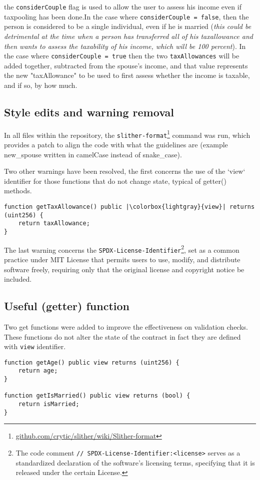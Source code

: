 \documentclass{article}
\begin{document}
the \texttt{considerCouple} flag is used to allow the user to assess his income even if taxpooling has been done.In the case where \texttt{considerCouple = false}, then the person is considered to be a single individual, even if he is married (\textit{this could be detrimental at the time when a person has transferred all of his taxallowance and then wants to assess the taxability of his income, which will be 100 percent}). In the case where \texttt{considerCouple = true} then the two \texttt{taxAllowances} will be added together, subtracted from the spouse's income, and that value represents the new "taxAllowance" to be used to first assess whether the income is taxable, and if so, by how much.



\subsection{Style edits and warning removal}
In all files within the repository, the \texttt{slither-format}\footnote{\href{https://github.com/crytic/slither/wiki/Slither-format}{github.com/crytic/slither/wiki/Slither-format}} command was run, which provides a patch to align the code with what the guidelines are (example new\_spouse written in camelCase instead of snake\_case).

Two other warnings have been resolved, the first concerns the use of the `view` identifier for those functions that do not change state, typical of getter() methods.
\begin{verbatim}
function getTaxAllowance() public |\colorbox{lightgray}{view}| returns (uint256) {
    return taxAllowance;
}
\end{verbatim}
The last warning concerns the \texttt{SPDX-License-Identifier}\footnote{The code comment \texttt{// SPDX-License-Identifier:<license>} serves as a standardized declaration of the software's licensing terms, specifying that it is released under the certain License.}, set as a common practice under MIT License that permits users to use, modify, and distribute software freely, requiring only that the original license and copyright notice be included.

\subsection{Useful (getter) function}
Two get functions were added to improve the effectiveness on validation checks. These functions do not alter the state of the contract in fact they are defined with \texttt{view} identifier.
\begin{verbatim}
function getAge() public view returns (uint256) {
    return age;
}

function getIsMarried() public view returns (bool) {
    return isMarried;
}
\end{verbatim}
\end{document}
